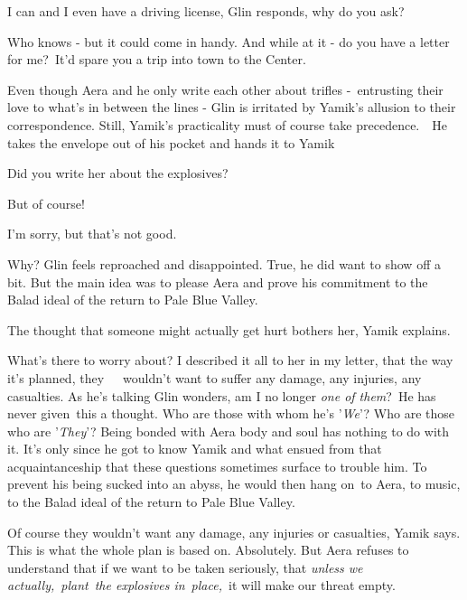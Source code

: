 \documentclass[letterpaper]{article}
\begin{document}
{\textquotedbl}I can and I even have a driving license,{\textquotedbl} Glin responds, {\textquotedbl}why do you
ask?{\textquotedbl}

{\textquotedbl}Who knows - but it could come in handy. And while at it - do you have a letter for me?\ It'd spare you a
trip into town to the Center.{\textquotedbl}\ 

Even though Aera and he only write each other about trifles -\ entrusting their love to what's in between the lines -
Glin is irritated by Yamik's allusion to their correspondence. Still, Yamik's practicality must of course take
precedence.\ \ He takes the envelope out of his pocket and hands it to Yamik ~ 

{\textquotedbl}Did you write her about the explosives?{\textquotedbl} 

{\textquotedbl}But of course!{\textquotedbl}~ 

{\textquotedbl}I'm sorry, but that's not good.{\textquotedbl} 

{\textquotedbl}Why?{\textquotedbl} Glin feels reproached and disappointed. True, he did want to show off a bit. But the
main idea was to please Aera and prove his commitment to the Balad ideal of the return to Pale Blue Valley. 

{\textquotedbl}The thought that someone might actually get hurt bothers her,{\textquotedbl} Yamik explains.

{\textquotedbl}What's there to worry about? I described it all to her in my letter, that the way it's planned,
they\ \ \ wouldn't want to suffer any damage, any injuries, any casualties.{\textquotedbl} As he's talking Glin
wonders, am I no longer \textit{one of them}?\textcolor[rgb]{0.0,0.4392157,0.7529412}{\ }He has never given~this a
thought. Who are those with whom he's '\textit{We}{}'? Who are those who are '\textit{They}{}'? Being bonded with Aera
body and soul has nothing to do with it. It's only since he got to know Yamik and what ensued from that
acquaintanceship that these questions sometimes surface to trouble him. To prevent his being sucked into an abyss, he
would then hang on\ to Aera, to music, to the Balad ideal of the return to Pale Blue Valley. 

{\textquotedbl}Of course they wouldn't want any damage, any injuries or casualties,{\textquotedbl} Yamik says.
{\textquotedbl}This is what the whole plan is based on. Absolutely. But Aera refuses to understand that if we want to
be taken seriously, that \textit{unless we actually,}\ \textit{plant}\ \textit{the explosives in}\ \textit{place,\ }it
will make our threat empty.{\textquotedbl} \ 
\end{document}
